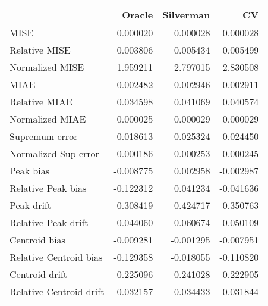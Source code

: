 \begin{tabular}{lrrr}
  \toprule
 & Oracle & Silverman & CV \\ 
  \midrule
MISE & 0.000020 & 0.000028 & 0.000028 \\ 
  Relative MISE & 0.003806 & 0.005434 & 0.005499 \\ 
  Normalized MISE & 1.959211 & 2.797015 & 2.830508 \\ 
  MIAE & 0.002482 & 0.002946 & 0.002911 \\ 
  Relative MIAE & 0.034598 & 0.041069 & 0.040574 \\ 
  Normalized MIAE & 0.000025 & 0.000029 & 0.000029 \\ 
  Supremum error & 0.018613 & 0.025324 & 0.024450 \\ 
  Normalized Sup error & 0.000186 & 0.000253 & 0.000245 \\ 
  Peak bias & -0.008775 & 0.002958 & -0.002987 \\ 
  Relative Peak bias & -0.122312 & 0.041234 & -0.041636 \\ 
  Peak drift & 0.308419 & 0.424717 & 0.350763 \\ 
  Relative Peak drift & 0.044060 & 0.060674 & 0.050109 \\ 
  Centroid bias & -0.009281 & -0.001295 & -0.007951 \\ 
  Relative Centroid bias & -0.129358 & -0.018055 & -0.110820 \\ 
  Centroid drift & 0.225096 & 0.241028 & 0.222905 \\ 
  Relative Centroid drift & 0.032157 & 0.034433 & 0.031844 \\ 
   \bottomrule
\end{tabular}
